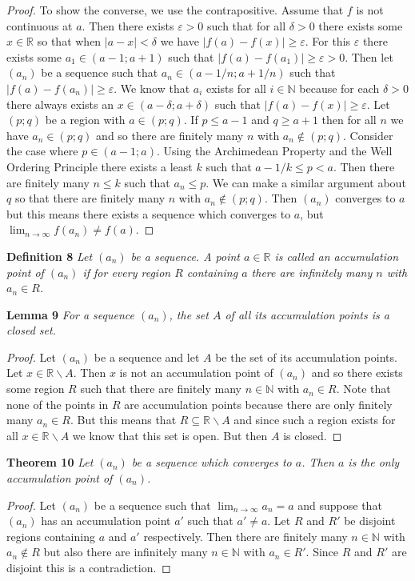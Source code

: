\documentclass{article}
\begin{document}
\begin{flushleft}
\begin{proof}
To show the converse, we use the contrapositive. Assume that $f$ is not continuous at $a$. Then there exists $\varepsilon > 0$ such that for all $\delta > 0$ there exists some $x \in \mathbb{R}$ so that when $|a - x| < \delta$ we have $|f(a) - f(x)| \geq \varepsilon$. For this $\varepsilon$ there exists some $a_1 \in (a - 1 ; a + 1)$ such that $|f(a) - f(a_1)| \geq \varepsilon > 0$. Then let $(a_n)$ be a sequence such that $a_n \in (a - 1/n ; a + 1/n)$ such that $|f(a) - f(a_n)| \geq \varepsilon$. We know that $a_i$ exists for all $i \in \mathbb{N}$ because for each $\delta > 0$ there always exists an $x \in (a - \delta ; a + \delta)$ such that $|f(a) - f(x)| \geq \varepsilon$. Let $(p;q)$ be a region with $a \in (p;q)$. If $p \leq a - 1$ and $q \geq a + 1$ then for all $n$ we have $a_n \in (p;q)$ and so there are finitely many $n$ with $a_n \notin (p;q)$. Consider the case where $p \in (a-1;a)$. Using the Archimedean Property and the Well Ordering Principle there exists a least $k$ such that $a-1/k \leq p < a$. Then there are finitely many $n \leq k$ such that $a_n \leq p$. We can make a similar argument about $q$ so that there are finitely many $n$ with $a_n \notin (p;q)$. Then $(a_n)$ converges to $a$ but this means there exists a sequence which converges to $a$, but $\lim_{n \rightarrow \infty} f(a_n) \neq f(a)$.
\end{proof}

\textbf{Definition 8}
\textsl{Let $(a_n)$ be a sequence. A point $a \in \mathbb{R}$ is called an accumulation point of $(a_n)$ if for every region $R$ containing $a$ there are infinitely many $n$ with $a_n \in R$.}\newline

\textbf{Lemma 9}
\textsl{For a sequence $(a_n)$, the set $A$ of all its accumulation points is a closed set.}
\begin{proof}
Let $(a_n)$ be a sequence and let $A$ be the set of its accumulation points. Let $x \in \mathbb{R} \backslash A$. Then $x$ is not an accumulation point of $(a_n)$ and so there exists some region $R$ such that there are finitely many $n \in \mathbb{N}$ with $a_n \in R$. Note that none of the points in $R$ are accumulation points because there are only finitely many $a_n \in R$. But this means that $R \subseteq \mathbb{R} \backslash A$ and since such a region exists for all $x \in \mathbb{R} \backslash A$ we know that this set is open. But then $A$ is closed.
\end{proof}

\textbf{Theorem 10}
\textsl{Let $(a_n)$ be a sequence which converges to $a$. Then $a$ is the only accumulation point of $(a_n)$.}
\begin{proof}
Let $(a_n)$ be a sequence such that $\lim_{n \rightarrow \infty} a_n = a$ and suppose that $(a_n)$ has an accumulation point $a'$ such that $a' \neq a$. Let $R$ and $R'$ be disjoint regions containing $a$ and $a'$ respectively. Then there are finitely many $n \in \mathbb{N}$ with $a_n \notin R$ but also there are infinitely many $n \in \mathbb{N}$ with $a_n \in R'$. Since $R$ and $R'$ are disjoint this is a contradiction.
\end{proof}


\end{flushleft}
\end{document}
